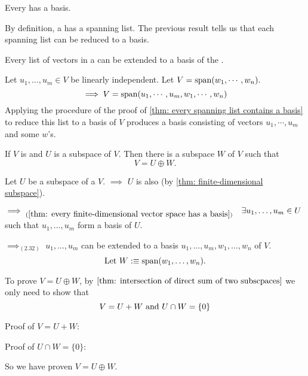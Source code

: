 \setcounter{thm}{30}
\begin{thm}  
  \label{thm: every finite-dimensional vector space has a basis}
  Every \findimvs has a basis.
\end{thm}
\begin{prf}
  By definition, a \fdvs has a spanning list. The previous result tells us that each spanning list can be reduced to a basis. 
\end{prf}

\begin{thm} 
  Every \lid list of vectors in a  \findimvs can be extended to a basis of the \vs. 
\end{thm}
\begin{prf}
  Let $u_1, \ldots, u_m \in V$ be linearly independent. Let $V=\operatorname{span} (w_1, \cdots, w_n).$
  \begin{equation}
    \implies V=\operatorname{span} (u_1, \cdots, u_m, w_1, \cdots, w_n )
  \end{equation}
  Applying the procedure of the proof of \ref{thm: every spanning list contains a basis} to reduce this list to a basis of $V$ produces a basis consisting of vectors $u_1, \cdots, u_m$ and some $w$'s.
\end{prf}

\begin{thm} 
  \label{thm: every subspace of V is part of a direct sum equal to V}
  If $V$ is \fd and $U$ is a subspace of $V$. Then there is a subspace $W$ of $V$ such that 
  \begin{equation}
    V=U \oplus W. 
  \end{equation}
\end{thm}
\begin{prf}
  Let $U$ be a subspace of a \fdvs $V$. $\implies$ $U$ is also \fd (by \ref{thm: finite-dimensional subspace}).

  $\implies_{(\ref{thm: every finite-dimensional vector space has a basis})} \quad \exists u_1, \ldots, u_m \in U $ such that $u_1, \ldots, u_m $ form a basis of $U.$

  
  $\implies_{(2.32)}$ $u_1, \ldots, u_m$ can be extended to a basis $u_1, \ldots, u_m, w_1, \ldots, w_n$ of $V$.
  \begin{equation}
    $Let $W :\equiv \myspan{w_1, \ldots, w_n}.
  \end{equation}
  
  To prove $V=U\oplus W$, by $\ref{thm: intersection of direct sum of two subscpaces}$ we only need to show that 
  \begin{equation}
    V = U+W$ and $U \cap W = \{0\}
  \end{equation}
  
  \begin{description}
    \item{Proof of $V=U+W$:} \lipsum[1]
    \item{Proof of $U \cap W = \{0\}$:} \lipsum[2]
  \end{description}
  So we have proven $V = U \oplus W$.
\end{prf}
